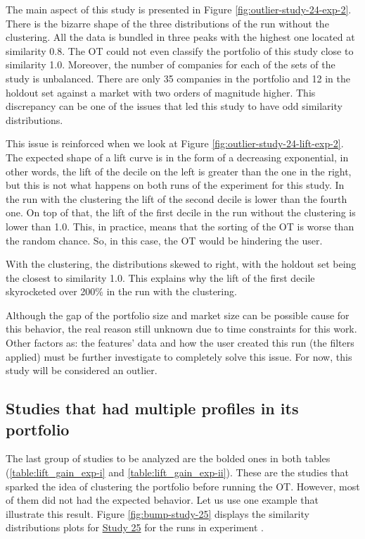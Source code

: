 The main aspect of this study is presented in Figure \ref{fig:outlier-study-24-exp-2}. There is the bizarre shape of the three distributions of the run without the clustering. All the data is bundled in three peaks with the highest one located at similarity 0.8. The OT could not even classify the portfolio of this study close to similarity 1.0. Moreover, the number of companies for each of the sets of the study is unbalanced. There are only 35 companies in the portfolio and 12 in the holdout set against a market with two orders of magnitude higher. This discrepancy can be one of the issues that led this study to have odd similarity distributions.

This issue is reinforced when we look at Figure \ref{fig:outlier-study-24-lift-exp-2}. The expected shape of a lift curve is in the form of a decreasing exponential, in other words, the lift of the decile on the left is greater than the one in the right, but this is not what happens on both runs of the experiment for this study. In the run with the clustering the lift of the second decile is lower than the fourth one. On top of that, the lift of the first decile in the run without the clustering is lower than 1.0. This, in practice, means that the sorting of the OT is worse than the random chance. So, in this case, the OT would be hindering the user.

With the clustering, the distributions skewed to right, with the holdout set being the closest to similarity 1.0. This explains why the lift of the first decile skyrocketed over 200\% in the run with the clustering.

Although the gap of the portfolio size and market size can be possible cause for this behavior, the real reason still unknown due to time constraints for this work. Other factors as: the features' data and how the user created this run (the filters applied) must be further investigate to completely solve this issue. For now, this study will be considered an outlier.

\subsection{Studies that had multiple profiles in its portfolio}

The last group of studies to be analyzed are the bolded ones in both tables (\ref{table:lift_gain_exp-i} and \ref{table:lift_gain_exp-ii}). These are the studies that sparked the idea of clustering the portfolio before running the OT. However, most of them did not had the expected behavior. Let us use one example that illustrate this result. Figure \ref{fig:bump-study-25} displays the similarity distributions plots for \underline{Study 25} for the runs in experiment \nameExperimentII{}. 

